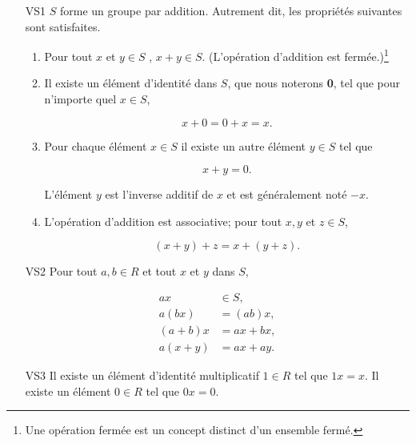 \documentclass[10pt,twoside,a4paper]{book}
\begin{document}
\begin{enumerate}
  \item[VS1] $S$ forme un groupe par addition. Autrement dit, les propriétés suivantes sont satisfaites.
  
  \begin{enumerate}
    \item Pour tout $x$ et $y \in S$ , $x + y \in S$. (L'opération d'addition est fermée.)\footnote{Une opération fermée est un concept distinct d'un ensemble fermé.}
    \item Il existe un élément d'identité dans $S$, que nous noterons \textbf{0}, tel que pour n'importe quel $x \in S$,
    
    \begin{equation*}
      x + 0 = 0 + x = x.
    \end{equation*}

    \item Pour chaque élément $x \in S$ il existe un autre élément $y \in S$ tel que
    
    \begin{equation*}
      x + y = 0.
    \end{equation*}

    \noindent
    L'élément $y$ est l'inverse additif de $x$ et est généralement noté $-x$.
    \item L'opération d'addition est associative; pour tout $x, y$ et $z \in S$,
    
    \begin{equation*}
      (x + y) + z = x + (y + z).
    \end{equation*}
  \end{enumerate}

  \item[VS2] Pour tout $a, b \in R$ et tout $x$ et $y$ dans $S$,
  
  \begin{align*}
    ax &\in S, \\
    a(bx) &= (ab)x, \\
    (a+b)x &= ax + bx, \\
    a(x+y) &= ax + ay.
  \end{align*}

  \item[VS3] Il existe un élément d'identité multiplicatif $1 \in R$ tel que $1x = x$. Il existe un élément $0 \in R$ tel que $0x = 0$.
  \vspace{4mm}
\end{enumerate}
\end{document}
